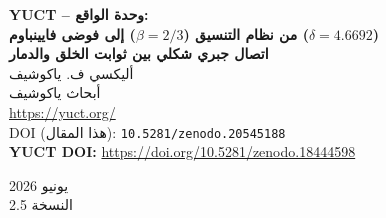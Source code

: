 \documentclass[12pt,a4paper]{article}
\begin{document}
	
	\begin{titlepage}
		\centering
		\vspace*{2cm}
		
		{\Huge\bfseries YUCT – وحدة الواقع:\\[0.3cm]
			من نظام التنسيق (\(\beta = 2/3\)) إلى فوضى فايينباوم (\(\delta = 4.6692\))}\\[1cm]
		
		{\Large\bfseries اتصال جبري شكلي بين ثوابت الخلق والدمار}\\[2cm]
		
		{\large أليكسي ف. ياكوشيف}\\[0.5cm]
		{\normalsize أبحاث ياكوشيف}\\[0.3cm]
		{\normalsize \url{https://yuct.org/}}\\[1.5cm]
		
		{\normalsize DOI (هذا المقال): \texttt{10.5281/zenodo.20545188}}\\
		\vspace*{1cm}
		\textbf{YUCT DOI:} \url{https://doi.org/10.5281/zenodo.18444598}\\
		\vspace*{1cm}
		
		{\normalsize يونيو 2026}\\[0.3cm]
		{\normalsize النسخة 2.5}\\[2cm]
	\end{titlepage}
	
\end{document}

